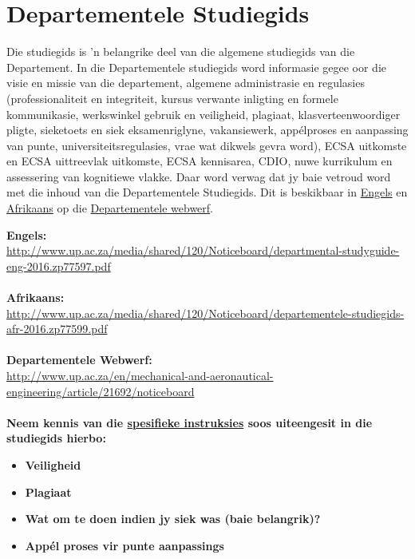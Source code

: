 \section{Departementele Studiegids}\label{sec:department}
    Die studiegids is 'n belangrike deel van die algemene studiegids van die
    Departement. In die Departementele studiegids word informasie gegee oor die
    visie en missie van die departement, algemene administrasie en regulasies
    (professionaliteit en integriteit, kursus verwante inligting en formele
    kommunikasie, werkswinkel gebruik en veiligheid, plagiaat,
    klasverteenwoordiger pligte, sieketoets en siek eksamenriglyne,
    vakansiewerk, app\'{e}lproses en aanpassing van punte,
    universiteitsregulasies, vrae wat dikwels gevra word), ECSA uitkomste en
    ECSA uittreevlak uitkomste, ECSA kennisarea, CDIO, nuwe kurrikulum en
    assessering van kognitiewe vlakke.  Daar word verwag dat jy baie vetroud
    word met die inhoud van die Departementele Studiegids. Dit is beskikbaar
    in
    \href{http://www.up.ac.za/media/shared/120/Noticeboard/departmental-studyguide-eng-2016.zp77597.pdf}{Engels}
    en
    \href{http://www.up.ac.za/media/shared/120/Noticeboard/departementele-studiegids-afr-2016.zp77599.pdf}{Afrikaans}
    op die
    \href{http://www.up.ac.za/en/mechanical-and-aeronautical-engineering/article/21692/noticeboard}{Departementele webwerf}.

    \noindent
    \textbf{Engels:} \\
    \url{http://www.up.ac.za/media/shared/120/Noticeboard/departmental-studyguide-eng-2016.zp77597.pdf} \\~\\
    \textbf{Afrikaans:} \\
    \url{http://www.up.ac.za/media/shared/120/Noticeboard/departementele-studiegids-afr-2016.zp77599.pdf} \\~\\
    \textbf{Departementele Webwerf:} \\
    \url{http://www.up.ac.za/en/mechanical-and-aeronautical-engineering/article/21692/noticeboard} \\~\\

    \noindent
    \textbf{Neem kennis van die \uline{spesifieke instruksies} soos uiteengesit
    in die studiegids hierbo:}
    \begin{itemize}
        \item \textbf{Veiligheid}
        \item \textbf{Plagiaat}
        \item \textbf{Wat om te doen indien jy siek was (baie belangrik)?}
        \item \textbf{App\'el proses vir punte aanpassings}
    \end{itemize}

